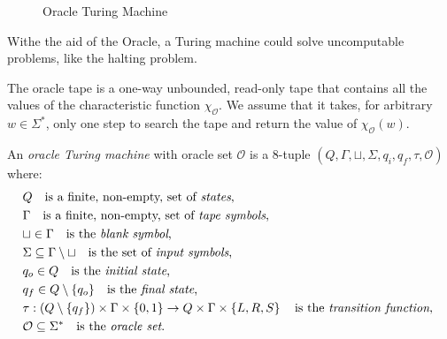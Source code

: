 \begin{figure}[t]
\centering
{}
\caption{\label{fig:Oracle-Turing-Machine}Oracle Turing Machine}
\end{figure}

Withe the aid of the Oracle, a Turing machine could solve uncomputable problems, like the halting problem.

{\color{red} The oracle tape is a one-way unbounded, read-only tape that contains all the values of the characteristic function $\chi_\mathcal{O}$. We assume that it takes, for arbitrary $w \in \Sigma^\ast$, only one step to search the tape and return the value of $\chi_\mathcal{O}(w)$.}

\begin{definition}
\label{def:Oracle-Turing-Machine}
An \emph{oracle Turing machine} with oracle set $\mathcal{O}$ is a 8-tuple $\left(Q, \Gamma, \sqcup, \Sigma, q_i, q_f, \tau, \mathcal{O} \right)$ where:
\begin{align*}
 & Q \quad \text{is a finite, non-empty, set of \emph{states},} \index{Machine State} \\
 & \Gamma \quad \text{is a finite, non-empty, set of \emph{tape symbols},} \index{Tape Symbol} \\
 & \sqcup\in\Gamma \quad \text{is the \emph{blank symbol},} \index{Blank Symbol} \\
 & \Sigma\subseteq\Gamma\setminus\sqcup \quad \text{is the set of \emph{input symbols},}  \index{Input Symbol} \\
 & q_{o}\in Q \quad \text{is the \emph{initial state},} \index{Initial State} \\
 & q_{f}\in Q \setminus \{q_o\} \quad \text{is the \emph{final state},} \index{Final State} \\ 
 & \tau: \left(Q \setminus \{q_{f}\}\right) \times \Gamma \times \{0, 1\} \rightarrow  Q\times\Gamma\times\left\{ L,R,S\right\} \quad\text{is the \emph{transition function}, \index{Transition Function} } \\
 & \mathcal{O} \subseteq \Sigma^\ast \quad \text{is the \emph{oracle set}.}
\end{align*}
\end{definition}


